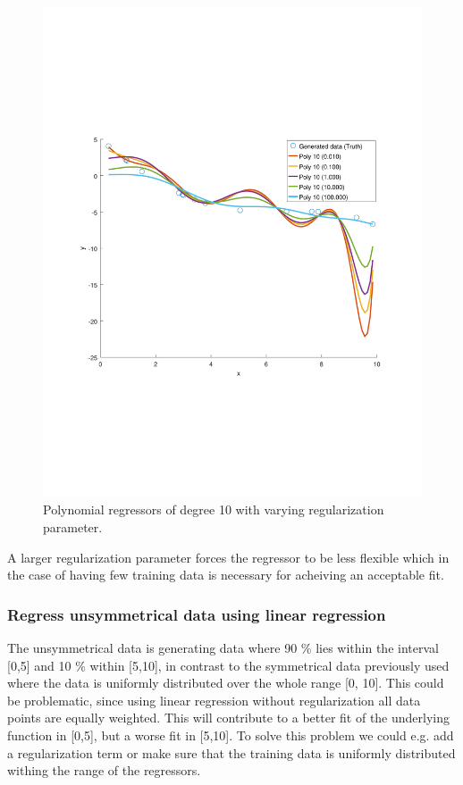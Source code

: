 \documentclass[]{article}
\begin{document}
\begin{figure}[ht]
	\centering
	\includegraphics[trim= 10cm 5cm 10cm 5cm, scale=0.4]{proj1-3_2b-10th}
	\caption{Polynomial regressors of degree 10 with varying regularization parameter.}
	\label{fig:poly10}
\end{figure}
A larger regularization parameter forces the regressor to be less flexible which in the case of having few training data is necessary for acheiving an acceptable fit.

\subsubsection{Regress unsymmetrical data using linear regression}
The unsymmetrical data is generating data where 90 \% lies within the interval [0,5] and 10 \% within [5,10], in contrast to the symmetrical data previously used where the data is uniformly distributed over the whole range [0, 10]. This could be problematic, since using linear regression without regularization all data points are equally weighted. This will contribute to a better fit of the underlying function in [0,5], but a worse fit in [5,10]. To solve this problem we could e.g. add a regularization term or make sure that the training data is uniformly distributed withing the range of the regressors.
\end{document}
